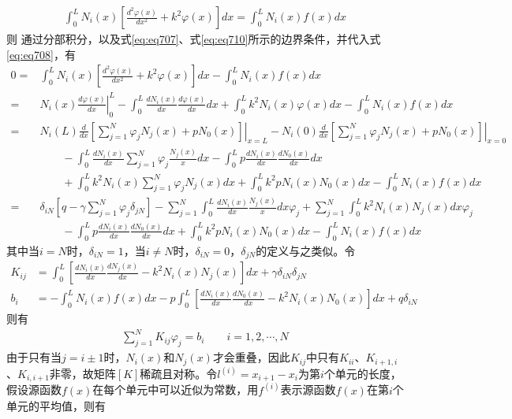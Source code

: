 \documentclass{article}
\numberwithin{equation}{section}
\begin{document}
\begin{align}
    \label{eq:eq709}
    \int_{0}^LN_i(x)\left[\frac{d^2\varphi(x)}{dx^2}+k^2\varphi(x)\right]dx=\int_{0}^LN_i(x)f(x)dx
\end{align}
则
通过分部积分，以及式\ref{eq:eq707}、式\ref{eq:eq710}所示的边界条件，并代入式\ref{eq:eq708}，有
\begin{align}
    \label{eq:eq738}
    0=&\int_{0}^LN_i(x)\left[\frac{d^2\varphi(x)}{dx^2}+k^2\varphi(x)\right]dx-\int_{0}^LN_i(x)f(x)dx \nonumber \\
     =&\left.N_i(x)\frac{d\varphi(x)}{dx}\right|^L_0-\int^L_0\frac{dN_i(x)}{dx}\frac{d\varphi(x)}{dx}dx+\int_0^Lk^2N_i(x)\varphi(x)dx-\int_0^LN_i(x)f(x)dx \nonumber \\
     =&N_i(L)\left.\frac{d}{dx}\left[\sum_{j=1}^{N}\varphi_jN_j(x)+pN_0(x)\right]\right|_{x=L}-N_i(0)\left.\frac{d}{dx}\left[\sum_{j=1}^{N}\varphi_jN_j(x)+pN_0(x)\right]\right|_{x=0} \nonumber \\
      &\qquad-\int_0^L\frac{dN_i(x)}{dx}\sum_{j=1}^{N}\varphi_j\frac{N_j(x)}{x}dx-\int_0^Lp\frac{dN_i(x)}{dx}\frac{dN_0(x)}{dx}dx \nonumber \\
      &\qquad+\int_0^Lk^2N_i(x)\sum_{j=1}^{N}\varphi_jN_j(x)dx+\int_0^Lk^2pN_i(x)N_0(x)dx-\int_0^LN_i(x)f(x)dx \nonumber \\
     =&\delta_{iN}\left[q-\gamma\sum_{j=1}^{N}\varphi_j\delta_{jN}\right]-\sum_{j=1}^{N}\int_0^L\frac{dN_i(x)}{dx}\frac{N_j(x)}{x}dx\varphi_j+\sum_{j=1}^{N}\int_0^Lk^2N_i(x)N_j(x)dx\varphi_j \nonumber \\
      &\qquad-\int_0^Lp\frac{dN_i(x)}{dx}\frac{dN_0(x)}{dx}dx+\int_0^Lk^2pN_i(x)N_0(x)dx-\int_0^LN_i(x)f(x)dx
\end{align}
其中当$i=N$时，$\delta_{iN}=1$，当$i\neq N$时，$\delta_{iN}=0$，$\delta_{jN}$的定义与之类似。令
\begin{align}
    \label{eq:eq712}
    K_{ij}&=\int^L_0\left[\frac{dN_i(x)}{dx}\frac{dN_j(x)}{dx}-k^2N_i(x)N_j(x)\right]dx+\gamma\delta_{iN}\delta_{jN} \\
    \label{eq:eq713}
    b_i&=-\int_{0}^LN_i(x)f(x)dx-p\int^L_0\left[\frac{dN_i(x)}{dx}\frac{dN_0(x)}{dx}-k^2N_i(x)N_0(x)\right]dx+q\delta_{iN}
\end{align}
则有
\begin{align}
    \label{eq:eq711}
    \sum_{j=1}^{N}K_{ij}\varphi_j=b_i\qquad i=1,2,\cdots,N
\end{align}
由于只有当$j=i\pm 1$时，$N_i(x)$和$N_j(x)$才会重叠，因此$K_{ij}$中只有$K_{ii}$、$K_{i+1,i}$、$K_{i,i+1}$非零，故矩阵$[K]$稀疏且对称。令$l^{(i)}=x_{i+1}-x_i$为第$i$个单元的长度，假设源函数$f(x)$在每个单元中可以近似为常数，用$f^{(i)}$表示源函数$f(x)$在第$i$个单元的平均值，则有
\end{document}

